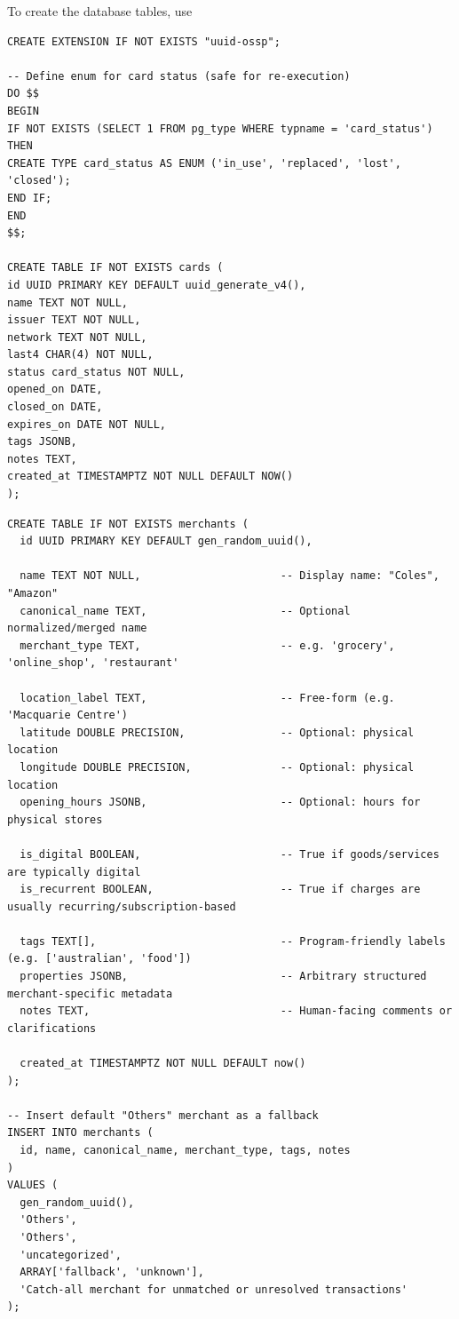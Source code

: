 To create the database tables, use
\begin{lstlisting}
CREATE EXTENSION IF NOT EXISTS "uuid-ossp";

-- Define enum for card status (safe for re-execution)
DO $$
BEGIN
IF NOT EXISTS (SELECT 1 FROM pg_type WHERE typname = 'card_status') THEN
CREATE TYPE card_status AS ENUM ('in_use', 'replaced', 'lost', 'closed');
END IF;
END
$$;

CREATE TABLE IF NOT EXISTS cards (
id UUID PRIMARY KEY DEFAULT uuid_generate_v4(),
name TEXT NOT NULL,
issuer TEXT NOT NULL,
network TEXT NOT NULL,
last4 CHAR(4) NOT NULL,
status card_status NOT NULL,
opened_on DATE,
closed_on DATE,
expires_on DATE NOT NULL,
tags JSONB,
notes TEXT,
created_at TIMESTAMPTZ NOT NULL DEFAULT NOW()
);
\end{lstlisting}

\begin{lstlisting}
CREATE TABLE IF NOT EXISTS merchants (
  id UUID PRIMARY KEY DEFAULT gen_random_uuid(),

  name TEXT NOT NULL,                      -- Display name: "Coles", "Amazon"
  canonical_name TEXT,                     -- Optional normalized/merged name
  merchant_type TEXT,                      -- e.g. 'grocery', 'online_shop', 'restaurant'

  location_label TEXT,                     -- Free-form (e.g. 'Macquarie Centre')
  latitude DOUBLE PRECISION,               -- Optional: physical location
  longitude DOUBLE PRECISION,              -- Optional: physical location
  opening_hours JSONB,                     -- Optional: hours for physical stores

  is_digital BOOLEAN,                      -- True if goods/services are typically digital
  is_recurrent BOOLEAN,                    -- True if charges are usually recurring/subscription-based

  tags TEXT[],                             -- Program-friendly labels (e.g. ['australian', 'food'])
  properties JSONB,                        -- Arbitrary structured merchant-specific metadata
  notes TEXT,                              -- Human-facing comments or clarifications

  created_at TIMESTAMPTZ NOT NULL DEFAULT now()
);

-- Insert default "Others" merchant as a fallback
INSERT INTO merchants (
  id, name, canonical_name, merchant_type, tags, notes
)
VALUES (
  gen_random_uuid(),
  'Others',
  'Others',
  'uncategorized',
  ARRAY['fallback', 'unknown'],
  'Catch-all merchant for unmatched or unresolved transactions'
);
\end{lstlisting}


